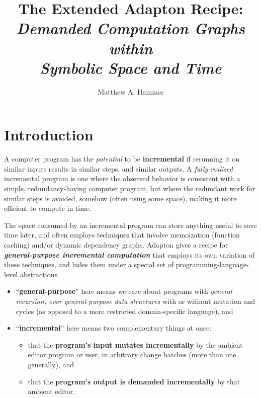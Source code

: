 \documentclass[11pt]{article}
\begin{document}
\author{Matthew A. Hammer}
\title{The Extended Adapton Recipe:
  \\
  \emph{Demanded Computation Graphs\\
  within\\
  Symbolic Space and Time}
}

\maketitle

\linenumbers

\section{Introduction}

A computer program has the \emph{potential} to be \textbf{incremental} if
rerunning it on similar inputs results in similar steps, and similar
outputs.
%
A \emph{fully-realized} incremental program is one where the observed
behavior is consistent with a simple, redundancy-having computer program,
but where the redundant work for similar steps is
avoided, somehow (often using some space), making it more efficient to compute in time.

The space consumed by an incremental program can store anything useful
to save time later, and often employs techniques that involve
memoization (function caching) and/or dynamic dependency graphs.
%
Adapton gives a recipe for \textbf{\emph{general-purpose incremental
  computation}} that employs its own variation of these techniques,
and hides them under a special set of programming-language-level
abstractions.
%
\begin{itemize}
\item ``\textbf{general-purpose}'' here means we care about programs
  with \emph{general recursion, over general-purpose data structures}
  with or without mutation and cycles (as opposed to a more restricted
  domain-specific language), and

\item ``\textbf{incremental}'' here means two complementary things at once:
  \begin {itemize}

  \item that the \textbf{program's input mutates incrementally} by the
    ambient editor program or user, in arbitrary change batches (more than one, generally), and

  \item that the \textbf{program's output is demanded incrementally}
    by that ambient editor.
  \end{itemize}
\end{itemize}
\end{document}
